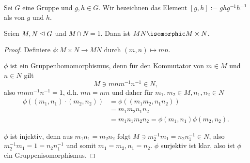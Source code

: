 \begin{df*}
	Sei $G$ eine Gruppe und $g, h \in G$.
	Wir bezeichnen das Element $[g,h] := ghg^{-1}h^{-1}$ als  von $g$ und $h$.
\end{df*}

\begin{lem} \label{2.4}
	Seien $M, N \trianglelefteq G$ und $M \cap N = 1$.
	Dann ist $M N \isomorphic M \times N$.
	\begin{proof}
		Definiere $\phi: M \times N \to M N$ durch $(m, n) \mapsto mn$.

		$\phi$ ist ein Gruppenhomomorphismus, denn für den Kommutator von $m \in M$ und $n \in N$ gilt
		\[
			M \ni mnm^{-1}n^{-1} \in N,
		\]
		also $mnm^{-1}n^{-1} = 1$, d.h. $mn = nm$ und daher für $m_1, m_2 \in M, n_1, n_2 \in N$
		\begin{align*}
			\phi((m_1, n_1) \cdot (m_2, n_2))
			&= \phi((m_1m_2, n_1n_2)) \\
			&= m_1 m_2 n_1 n_2 \\
			&= m_1 n_1 m_2 n_2
			= \phi(m_1, n_1) \phi(m_2, n_2).
		\end{align*}

		$\phi$ ist injektiv, denn aus $m_1 n_1 = m_2 n_2$ folgt $M \ni m_2^{-1} m_1 = n_2 n_1^{-1} \in N$, also $m_2^{-1}m_1 = 1 = n_2 n_1^{-1}$ und somit $m_1 = m_2, n_1 = n_2$.
		$\phi$ surjektiv ist klar, also ist $\phi$ ein Gruppenisomorphismus.
	\end{proof}
\end{lem}

